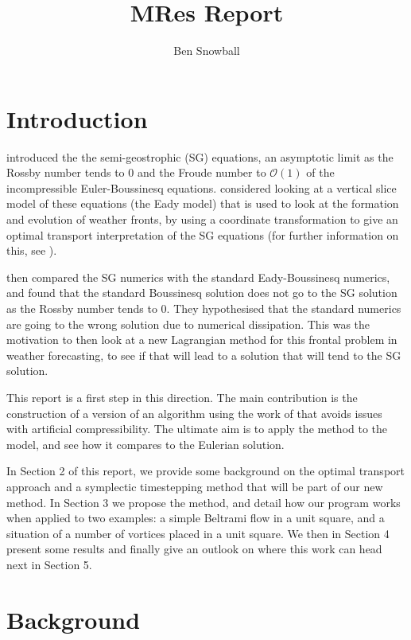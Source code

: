 \documentclass[11pt, oneside]{article}   	%
\title{MRes Report}
\author{Ben Snowball}
\begin{document}
\maketitle
\section{Introduction}

\cite{hoskins1971atmospheric} introduced the the semi-geostrophic (SG) equations, an asymptotic limit as the Rossby number tends to \(0\) and the Froude number to \(\mathcal{O}(1)\) of the incompressible Euler-Boussinesq equations. \cite{cullen1993geometric} considered looking at a vertical slice model of these equations (the Eady model) that is used to look at the formation and evolution of weather fronts, by using a coordinate transformation to give an optimal transport interpretation of the SG equations (for further information on this, see \cite{cullen2006mathematical}).

\cite{visram2014framework} then compared the SG numerics with the standard Eady-Boussinesq numerics, and found that the standard Boussinesq solution does not go to the SG solution as the Rossby number tends to \(0\). They hypothesised that the standard numerics are going to the wrong solution due to numerical dissipation. This was the motivation to then look at a new Lagrangian method for this frontal problem in weather forecasting, to see if that will lead to a solution that will tend to the SG solution. 

This report is a first step in this direction. The main contribution is the construction of a version of an algorithm using the work of \cite{gallouet2016lagrangian} that avoids issues with artificial compressibility. The ultimate aim is to apply the method to the model, and see how it compares to the Eulerian solution.

In Section 2 of this report, we provide some background on the optimal transport approach and a symplectic timestepping method that will be part of our new method. In Section 3 we propose the method, and detail how our program works when applied to two examples: a simple Beltrami flow in a unit square, and a situation of a number of vortices placed in a unit square. We then in Section 4 present some results and finally give an outlook on where this work can head next in Section 5.


\section{Background}
\end{document}
